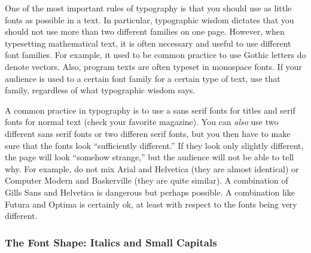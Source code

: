 One of the most important rules of typography is that you should use
as little fonts as possible in a text. In particular, typographic
wisdom dictates that you should not use more than two different
families on one page. However, when typesetting
mathematical text, it is often necessary and useful to use different
font families. For example, it used to be common practice to use
Gothic letters do denote vectors. Also, program texts are often
typeset in monospace fonts. If your audience is used to a certain font
family for a certain type of text, use that family, regardless of what
typographic wisdom says.

A common practice in typography is to use a sans serif fonts for
titles and serif fonts for normal text (check your favorite
magazine). You can \emph{also} use two different sans serif fonts or
two differen serif fonts, but you then have to make sure that the
fonts look ``sufficiently different.'' If they look only slightly
different, the page will look ``somehow strange,'' but the audience
will not be able to tell why. For example, do not mix Arial and
Helvetica (they are almost identical) or Computer Modern and
Baskerville (they are quite similar). A combination of Gills Sans and
Helvetica is dangerous but perhaps possible. A combination like Futura
and Optima is certainly ok, at least with respect to the fonts being
very different.




\subsubsection{The Font Shape: Italics and Small Capitals}

\label{section-italics}
\label{section-smallcaps}

